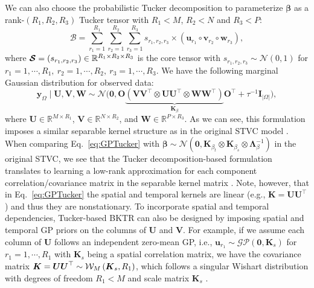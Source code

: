 \documentclass[12pt]{article}
\newcommand{\bd}[1]{\boldsymbol{#1}}
\begin{document}
We can also choose the probabilistic Tucker decomposition \citep{kolda2009tensor} to parameterize $\bd{\beta}$ as a rank-$(R_1,R_2,R_3)$ Tucker tensor with $R_1< M$, $R_2< N$ and $R_3< P$:
\begin{equation}
    \boldsymbol{\mathcal{B}}=\sum_{r_1=1}^{R_1}\sum_{r_2=1}^{R_2}\sum_{r_3=1}^{R_3}s_{r_1,r_2,r_3}\times\left( \boldsymbol{u}_{r_1}\circ\boldsymbol{v}_{r_2}\circ\boldsymbol{w}_{r_3}\right),
\end{equation}
where $\bd{\cal{S}}=\left(s_{r_1,r_2,r_3}\right)\in \mathbb{R}^{R_1\times R_2 \times R_3}$ is the core tensor with $s_{r_1,r_2,r_3}\sim \mathcal{N}\left(0,1\right)$ for $r_1=1,\cdots,R_1,\ r_2=1,\cdots,R_2,\ r_3=1,\cdots,R_3$. %
We have the following marginal Gaussian distribution for observed data: %
\begin{equation}\label{eq:GPTucker}
        \boldsymbol{y}_{\Omega} \;|\; \bd{U},\bd{V},\bd{W} \sim  \mathcal{N}\Big(\boldsymbol{0}, \boldsymbol{O}\underbrace{\left(\boldsymbol{V}\boldsymbol{V}^{\top}\otimes\boldsymbol{U}\boldsymbol{U}^{\top}\otimes\boldsymbol{W}\boldsymbol{W}^{\top}\right)}_{\boldsymbol{K}_{\beta}}\boldsymbol{O}^{\top}+\tau^{-1}\boldsymbol{I}_{|\Omega|}\Big),
\end{equation}
where $\boldsymbol{U}\in\mathbb{R}^{M\times R_1}$, $\boldsymbol{V}\in\mathbb{R}^{N\times R_2}$, and $\boldsymbol{W}\in\mathbb{R}^{P\times R_3}$. As we can see, this formulation imposes a similar separable kernel structure as in the original STVC model \citep{gelfand2003spatial}. When comparing Eq.~\eqref{eq:GPTucker} with $\bd{\beta}\sim \mathcal{N}(\bd{0}, \bd{K}_{\beta_t}\otimes \bd{K}_{\beta_s} \otimes \bd{\Lambda}_{\beta}^{-1})$ in the original STVC, we see that the Tucker decomposition-based formulation translates to learning a low-rank approximation for each component correlation/covariance matrix in the separable kernel matrix \citep{yu2018tensor}. Note, however, that in Eq.~\eqref{eq:GPTucker} the spatial and temporal kernels are linear (e.g., $\bd{K}=\bd{U}\bd{U}^{\top}$) and thus they are nonstationary. To incorporate spatial and temporal dependencies, Tucker-based BKTR can also be designed by imposing spatial and temporal GP priors on the columns of $\bd{U}$ and $\bd{V}$. For example, if we assume each column of $\bd{U}$ follows an independent zero-mean GP, i.e., $\boldsymbol{u}_{r_1}\sim\mathcal{GP}\left(\boldsymbol{0},\boldsymbol{K}_{s}\right)$ for $r_1=1,\cdots,R_1$ with $\boldsymbol{K}_{s}$ being a spatial correlation matrix, we have the covariance matrix $\bd{K}=\bd{U}\bd{U}^{\top}\sim {\cal{W}}_M\left(\bd{K}_{s},R_1\right)$, which follows a singular Wishart distribution with degrees of freedom $R_1<M$ and scale matrix $\bd{K}_{s}$ \citep{uhlig1994singular}.
\end{document}
